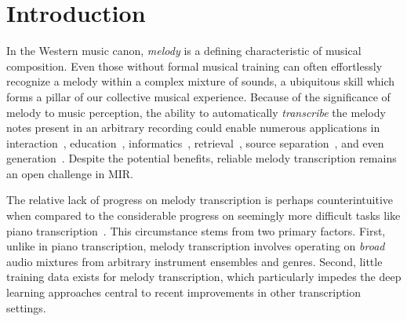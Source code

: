 \section{Introduction}\label{sec:introduction}

In the Western music canon, 
\emph{melody} is a defining characteristic of musical composition. 
Even those without formal musical training can often effortlessly recognize a melody within a complex mixture of sounds, 
a ubiquitous skill which forms a pillar of our collective musical experience. %
Because of the significance of melody to music perception, 
the ability to automatically \emph{transcribe} the melody notes present in an arbitrary recording 
could enable numerous applications in 
interaction~\cite{ryynanen2008accompaniment}, 
education~\cite{droe2006music}, 
informatics~\cite{bainbridge1999towards}, 
retrieval~\cite{ghias1995query}, 
source separation~\cite{ewert2014score},
and even generation~\cite{hawthorne2019enabling}.
Despite the potential benefits, 
reliable melody transcription remains an open challenge in MIR.

The relative lack of progress on melody transcription is perhaps counterintuitive when compared to the considerable progress on seemingly more difficult tasks like piano transcription~\cite{sigtia2016end,hawthorne2017onsets}.
This circumstance stems from two primary factors. 
First, unlike in piano transcription, melody transcription involves operating on \emph{broad}
audio mixtures from arbitrary instrument ensembles and genres. 
Second, little training data exists for melody transcription, which particularly impedes the deep learning approaches central to recent improvements in other transcription settings. 

